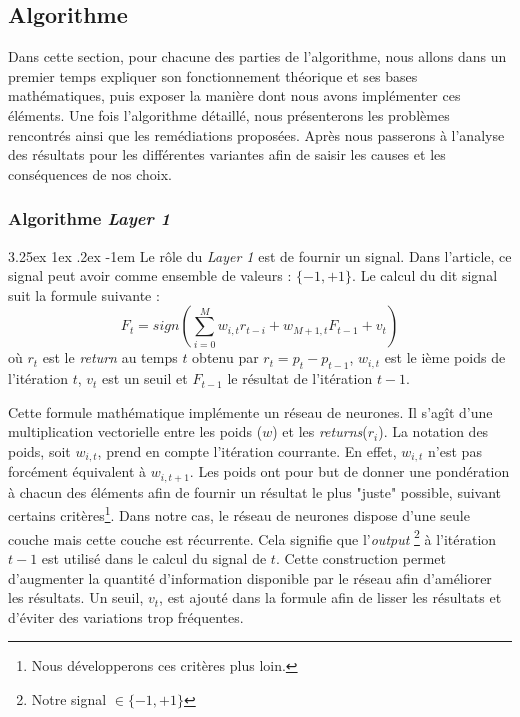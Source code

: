 \documentclass[a4paper, 11pt]{article}
\makeatletter
\renewcommand\paragraph{\@startsection{paragraph}{5}{\z@}%
  {3.25ex \@plus1ex \@minus.2ex}%
  {-1em}%
  {\normalfont\normalsize\bfseries}}
\makeatother
\begin{document}
\subsection{Algorithme}
Dans cette section, pour chacune des parties de l'algorithme, nous allons dans un premier temps expliquer son fonctionnement théorique et ses bases
mathématiques, puis exposer la manière dont nous avons implémenter ces éléments.
Une fois l'algorithme détaillé, nous présenterons les problèmes rencontrés ainsi que les remédiations proposées. Après nous passerons à l'analyse des
résultats pour les différentes variantes afin de saisir les causes et les conséquences de nos choix.


\subsubsection{Algorithme \textit{Layer 1}}
\paragraph{}
Le rôle du \textit{Layer 1} est de fournir un signal. Dans l'article, ce signal peut avoir comme ensemble de valeurs : $\{-1,+1\}$. Le calcul du dit
signal suit la formule suivante \cite{fx_trading}:
$$F_t = sign(\sum_{i=0}^M w_{i,t} r_{t-i} + w_{M+1,t} F_{t-1} + v_t)$$
où $r_t$ est le \textit{return} au temps $t$ obtenu par $r_t = p_t - p_{t-1}$, $w_{i,t}$ est le ième poids de l'itération $t$, $v_t$ est un seuil et $F_{t-1}$ le résultat de l'itération $t-1$.

Cette formule mathématique implémente un réseau de neurones. Il s'agît d'une multiplication vectorielle entre les poids ($w$) et les \textit{returns}($r_i$). La notation des poids, soit $w_{i,t}$, prend en compte l'itération courrante. En effet, $w_{i,t}$ n'est pas forcément équivalent à $w_{i,t+1}$. Les poids ont pour but de donner une pondération à chacun des éléments afin de fournir un résultat le plus "juste" possible, suivant certains
critères\footnote{Nous développerons ces critères plus loin.}.
Dans notre cas, le réseau de neurones dispose d'une seule couche mais cette couche est récurrente. Cela signifie que l'\textit{output}
\footnote{Notre signal $\in \{-1,+1\}$} à l'itération $t-1$ est utilisé dans le calcul du signal de $t$. Cette construction permet d'augmenter
la quantité d'information disponible par le réseau afin d'améliorer les résultats.
Un seuil, $v_t$, est ajouté dans la formule afin de lisser les résultats et d'éviter des variations trop fréquentes.
\end{document}
